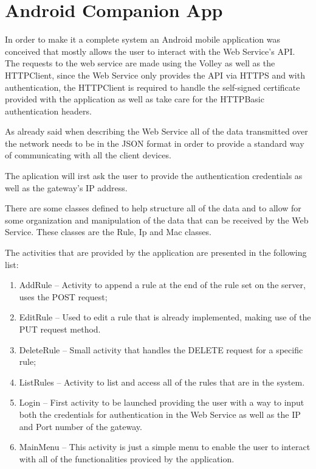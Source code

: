 \section{Android Companion App}
\label{chap4:sec:android}
In order to make it a complete system an Android mobile application was
conceived that mostly allows the user to interact with the Web Service's API.
The requests to the web service are made using the Volley as well as the
HTTPClient, since the Web Service only provides the API via HTTPS and with
authentication, the HTTPClient is required to handle the self-signed certificate
provided with the application as well as take care for the HTTPBasic
authentication headers.

As already said when describing the Web Service all of the data transmitted over
the network needs to be in the JSON format in order to provide a standard way of
communicating with all the client devices.

The aplication will irst ask the user to provide the authentication credentials
as well as the gateway's IP address.


There are some classes defined to help structure all of the data and to allow
for some organization and manipulation of the data that can be received by the
Web Service. These classes are the Rule, Ip and Mac classes.

The activities that are provided by the application are presented in the
following list:
\begin{enumerate}
	\item AddRule -- Activity to append a rule at the end of the rule set on the
		server, uses the POST request;
	\item EditRule -- Used to edit a rule that is already implemented, making
		use of the PUT request method.
	\item DeleteRule -- Small activity that handles the DELETE request for a
		specific rule;
	\item ListRules -- Activity to list and access all of the rules that are in
		the system.
	\item Login -- First activity to be launched providing the user with a way
		to input both the credentials for authentication in the Web Service as
		well as the IP and Port number of the gateway.
	\item MainMenu -- This activity is just a simple menu to enable the user to
		interact with all of the functionalities proviced by the application.
\end{enumerate}

